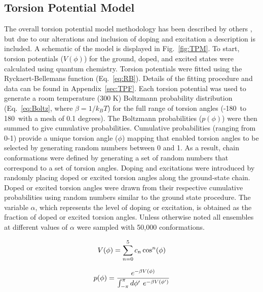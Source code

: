 \subsection{Torsion Potential Model} The overall torsion potential model methodology has been described by others \cite{Zhang2014, Claudio2001}, but due to our alterations and inclusion of doping and excitation a description is included. A schematic of the model is displayed in Fig.~\ref{fig:TPM}. To start, torsion potentials ($V(\phi)$) for the ground, doped, and excited states were calculated using quantum chemistry. Torsion potentials were fitted using the Ryckaert-Bellemans function (Eq.~\ref{eq:RB}). Details of the fitting procedure and data can be found in Appendix~\ref{sec:TPF}. Each torsion potential was used to generate a room temperature (300 K) Boltzmann probability distribution (Eq.~\ref{eq:Boltz}, where $\beta = 1/k_BT$) for the full range of torsion angles (-180\textdegree \ to 180\textdegree \ with a mesh of 0.1 degrees). The Boltzmann probabilities ($p(\phi)$) were then summed to give cumulative probabilities. Cumulative probabilities (ranging from 0-1) provide a unique torsion angle ($\phi$) mapping that enabled torsion angles to be selected by generating random numbers between 0 and 1. As a result, chain conformations were defined by generating a set of random numbers that correspond to a set of torsion angles. Doping and excitations were introduced by randomly placing doped or excited torsion angles along the ground-state chain. Doped or excited torsion angles were drawn from their respective cumulative probabilities using random numbers similar to the ground state procedure. The variable $\alpha$, which represents the level of doping or excitation, is obtained as the fraction of doped or excited torsion angles. Unless otherwise noted all ensembles at different values of $\alpha$ were sampled with 50,000 conformations.

\begin{equation}
\label{eq:RB}
\large
V(\phi) = \sum_{n=0}^{5} c_n \cos^n(\phi)
\end{equation}

\begin{equation}
\label{eq:Boltz}
\large
p(\phi) = \frac{e^{-\beta V(\phi)}}{\int_{-\pi}^{\pi} d\phi' \ e^{-\beta V(\phi')}}
\end{equation}

